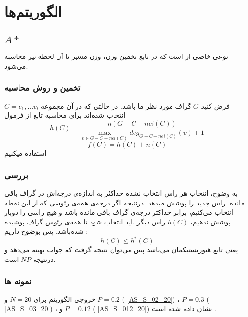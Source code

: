 \chapter{الگوریتم‌ها}
\section{$A*$}
نوعی خاصی از
است که در تابع تخمین وزن، وزن مسیر تا آن لحظه نیز محاسبه می‌شود.
\subsection{تخمین و روش محاسبه}
فرض کنید
 $G$
 گراف مورد نظر ما باشد.
 در حالتی که در آن مجموعه
 ‌$C={v_{1},... v_{t}}$
  انتخاب شده‌اند
برای محاسبه تابع 
از فرمول
\begin{equation}
\label{e01}
h(C) = \frac{n(G - C - nei(C))}{\max\limits_{v \in {G - C - nei(C)}} {deg_{G - C - nei(C)}(v) + 1}}
\end{equation}
\begin{equation}
\label{e02}
f(C) = h(C) + n(C)
\end{equation}
استفاده میکنیم
\subsection{بررسی \label{AS_ADMISSIBLE}}
به وضوح، انتخاب هر راس انتخاب نشده حداکثر به اندازه‌ی درجه‌اش در گراف باقی مانده، راس جدید را پوشش میدهد. درنتیجه اگر درجه‌ی همه‌ی رئوسی که از این نقطه انتخاب می‌کنیم، برابر حداکثر درجه‌ی گراف باقی مانده باشد و هیچ راسی را دوبار پوشش ندهیم،
$h(C)$
راس دیگر باید انتخاب شود تا همه‌ی رئوس گراف پوشیده شده‌باشد.
 پس بوضوح داریم :
\begin{equation}
\label{e03}
h(C) \leq h^*(C)
\end{equation}
یعنی تابع هیوریستیکمان 
می‌باشد پس می‌توان نتیجه گرفت که 
جواب بهینه می‌دهد و درنتیجه 
‌‌$NP$
است.

\subsection{نمونه ها}
خروجی الگوریتم برای
$N=20$
و 
$P=0.2$
(
\cref{AS_S_02_20})
،
$P=0.3$
(
\cref{AS_S_03_20})
،
و
$P=0.12$
(
\cref{AS_S_012_20})
نشان داده شده است
.

